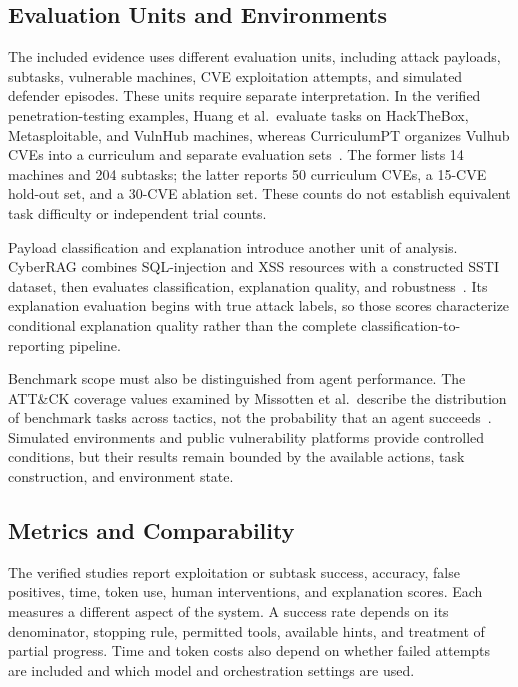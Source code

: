 \subsection{Evaluation Units and Environments}

The included evidence uses different evaluation units, including attack payloads, subtasks, vulnerable machines, CVE exploitation attempts, and simulated defender episodes. These units require separate interpretation. In the verified penetration-testing examples, Huang et al.\ evaluate tasks on HackTheBox, Metasploitable, and VulnHub machines, whereas CurriculumPT organizes Vulhub CVEs into a curriculum and separate evaluation sets~\cite{R0320_Huang_2025,R0322_Wu_2025}. The former lists 14 machines and 204 subtasks; the latter reports 50 curriculum CVEs, a 15-CVE hold-out set, and a 30-CVE ablation set. These counts do not establish equivalent task difficulty or independent trial counts.

Payload classification and explanation introduce another unit of analysis. CyberRAG combines SQL-injection and XSS resources with a constructed SSTI dataset, then evaluates classification, explanation quality, and robustness~\cite{R0447_Blefari_2026}. Its explanation evaluation begins with true attack labels, so those scores characterize conditional explanation quality rather than the complete classification-to-reporting pipeline.

Benchmark scope must also be distinguished from agent performance. The ATT\&CK coverage values examined by Missotten et al.\ describe the distribution of benchmark tasks across tactics, not the probability that an agent succeeds~\cite{R0249_Missotten_2025}. Simulated environments and public vulnerability platforms provide controlled conditions, but their results remain bounded by the available actions, task construction, and environment state.

\subsection{Metrics and Comparability}

The verified studies report exploitation or subtask success, accuracy, false positives, time, token use, human interventions, and explanation scores. Each measures a different aspect of the system. A success rate depends on its denominator, stopping rule, permitted tools, available hints, and treatment of partial progress. Time and token costs also depend on whether failed attempts are included and which model and orchestration settings are used.

